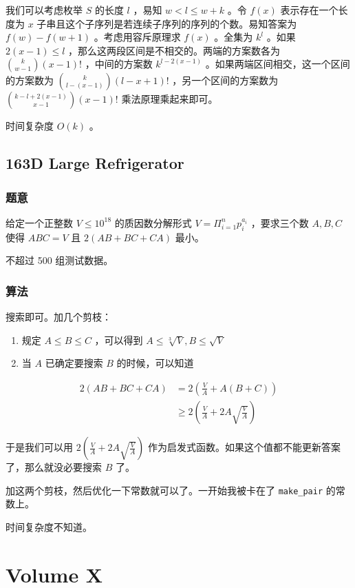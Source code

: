 \documentclass[11pt]{article}
\begin{document}
    我们可以考虑枚举 $S$ 的长度 $l$ ，易知 $w < l \leq w + k$ 。令 $f(x)$ 表示存在一个长度为 $x$ 子串且这个子序列是若连续子序列的序列的个数。易知答案为 $f(w) - f(w + 1)$ 。考虑用容斥原理求 $f(x)$ 。全集为 $k^l$ 。如果 $2(x - 1) \leq l$ ，那么这两段区间是不相交的。两端的方案数各为 ${k \choose w - 1} (x - 1)!$ ，中间的方案数 $k^{l - 2(x - 1)}$ 。如果两端区间相交，这一个区间的方案数为 ${k \choose l - (x - 1)} (l - x + 1)!$ ，另一个区间的方案数为 ${k - l + 2(x - 1) \choose x - 1} (x - 1)!$ 乘法原理乘起来即可。

    时间复杂度 $O(k)$ 。
\subsection{163D  Large Refrigerator}
\label{sec-9-9}
\subsubsection{题意}
\label{sec-9-9-1}

    给定一个正整数 $V \leq 10^{18}$ 的质因数分解形式 $V = \Pi_{i = 1}^n p_i ^{a_i}$ ，要求三个数 $A, B, C$ 使得 $ABC = V$ 且 $2(AB + BC + CA)$ 最小。

    不超过 500 组测试数据。
\subsubsection{算法}
\label{sec-9-9-2}

    搜索即可。加几个剪枝：
\begin{enumerate}
\item 规定 $A \leq B \leq C$ ，可以得到 $A \leq \sqrt[3]{V}, B \leq \sqrt{V}$
\item 当 $A$ 已确定要搜索 $B$ 的时候，可以知道
\end{enumerate}
\begin{equation*}\begin{aligned} 2(AB + BC + CA) &= 2(\frac{V}{A} + A (B + C)) \\ &\geq 2 (\frac{V}{A} + 2A \sqrt{\frac{V}{A}}) \end{aligned}\end{equation*}

         于是我们可以用 $2 (\frac{V}{A} + 2A \sqrt{\frac{V}{A}})$ 作为启发式函数。如果这个值都不能更新答案了，那么就没必要搜索 $B$ 了。

   加这两个剪枝，然后优化一下常数就可以了。一开始我被卡在了 \texttt{make\_pair} 的常数上。

   时间复杂度不知道。
\section{Volume X}
\label{sec-10}
\end{document}
